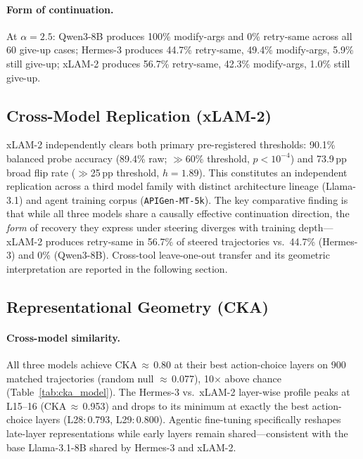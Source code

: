 \documentclass{article}
\begin{document}
\paragraph{Form of continuation.}
At $\alpha{=}2.5$: Qwen3-8B produces 100\% modify-args and 0\%
retry-same across all 60 give-up cases; Hermes-3 produces 44.7\%
retry-same, 49.4\% modify-args, 5.9\% still give-up; xLAM-2
produces 56.7\% retry-same, 42.3\% modify-args, 1.0\% still give-up.

\subsection{Cross-Model Replication (xLAM-2)}

xLAM-2 independently clears both primary pre-registered thresholds:
90.1\% balanced probe accuracy (89.4\% raw; $\gg$60\% threshold, $p<10^{-4}$) and
73.9\,pp broad flip rate ($\gg$25\,pp threshold, $h{=}1.89$).
This constitutes an independent replication across a third model
family with distinct architecture lineage (Llama-3.1) and agent
training corpus (\texttt{APIGen-MT-5k}).
The key comparative finding is that while all three models share a
causally effective continuation direction, the \emph{form} of recovery
they express under steering diverges with training depth---xLAM-2
produces retry-same in 56.7\% of steered trajectories vs.\ 44.7\%
(Hermes-3) and 0\% (Qwen3-8B).
Cross-tool leave-one-out transfer and its geometric interpretation are
reported in the following section.

\subsection{Representational Geometry (CKA)}
\label{sec:cka}

\paragraph{Cross-model similarity.}
All three models achieve CKA\,$\approx$\,0.80 at their best
action-choice layers on 900 matched trajectories (random null
$\approx$\,0.077), 10$\times$ above chance
(Table~\ref{tab:cka_model}).
The Hermes-3 vs.\ xLAM-2 layer-wise profile peaks at L15--16
(CKA\,$\approx$\,0.953) and drops to its minimum at exactly the
best action-choice layers (L28:\,0.793, L29:\,0.800).
Agentic fine-tuning specifically reshapes late-layer representations
while early layers remain shared---consistent with the base
Llama-3.1-8B shared by Hermes-3 and xLAM-2.
\end{document}
